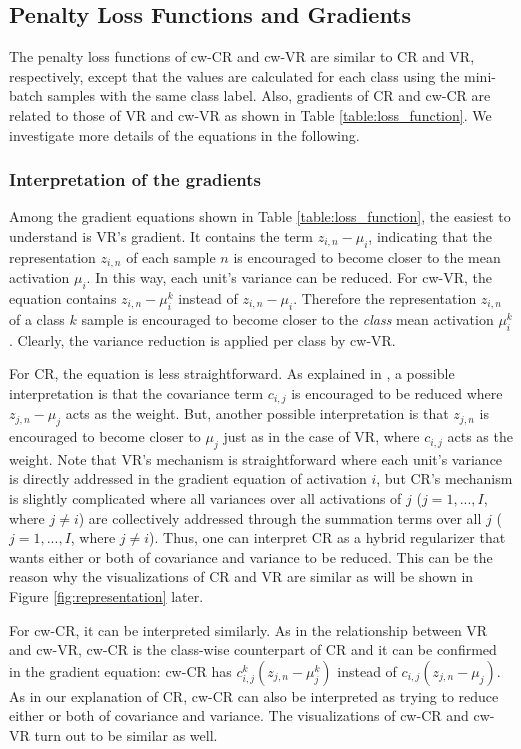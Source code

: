 \documentclass[letterpaper]{article} %
\begin{document}
\subsection{Penalty Loss Functions and Gradients}

The penalty loss functions of cw-CR and cw-VR are similar to CR and VR, respectively, except that the values are calculated for each class using the mini-batch samples with the same class label. Also, gradients of CR and cw-CR are related to those of VR and cw-VR as shown in Table \ref{table:loss_function}. We investigate more details of the equations in the following.

\subsubsection{Interpretation of the gradients}
Among the gradient equations shown in Table \ref{table:loss_function}, the easiest to understand is VR's gradient. It contains the term ${z}_{i,n}-{\mu}_{i}$, indicating that the representation ${z}_{i,n}$ of each sample $n$ is encouraged to become closer to the mean activation ${\mu}_{i}$. In this way, each unit's variance can be reduced. For cw-VR, the equation contains ${z}_{i,n}-{\mu}_{i}^{k}$ instead of ${z}_{i,n}-{\mu}_{i}$. Therefore the representation ${z}_{i,n}$ of a class $k$ sample is encouraged to become closer to the \textit{class} mean activation ${\mu}_{i}^{k}$. Clearly, the variance reduction is applied per class by cw-VR. 

For CR, the equation is less straightforward. As explained in \cite{cogswell2015reducing}, a possible interpretation is that the covariance term $c_{i,j}$ is encouraged to be reduced where $z_{j,n}-\mu_j$ acts as the weight. But, another possible interpretation is that $z_{j,n}$ is encouraged to become closer to $\mu_j$ just as in the case of VR, where $c_{i,j}$ acts as the weight. Note that VR's mechanism is straightforward where each unit's variance is directly addressed in the gradient equation of activation $i$, but CR's mechanism is slightly complicated where all variances over all activations of $j$ ($j=1,...,I$, where $j \neq i$) are collectively addressed through the summation terms over all $j$ ($j=1,...,I$, where $j \neq i$). Thus, one can interpret CR as a hybrid regularizer that wants either or both of covariance and variance to be reduced. This can be the reason why the visualizations of CR and VR are similar as will be shown in Figure \ref{fig:representation} later. 

For cw-CR, it can be interpreted similarly. As in the relationship between VR and cw-VR, cw-CR is the class-wise counterpart of CR and it can be confirmed in the gradient equation: cw-CR has $c_{i,j}^k({z}_{j,n}-{\mu}_{j}^{k})$ instead of $c_{i,j}({z}_{j,n}-{\mu}_{j})$. As in our explanation of CR, cw-CR can also be interpreted as trying to reduce either or both of covariance and variance. The visualizations of cw-CR and cw-VR turn out to be similar as well. 
\end{document}

